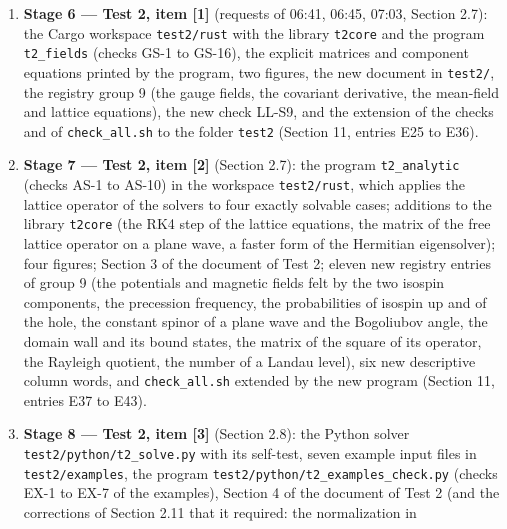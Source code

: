 \documentclass[
  10pt,
]{article}
\begin{document}
\begin{enumerate}
  \texttt{r13\_yukawa} with the checks Z-1 to Z-8, four new figures, the
  document in \texttt{explanations/}, new registry entries
  (\(\mathsf L_{\rm LL}(\mathbf g)\), \(\chi_{\rm LL}\),
  \(\theta_{\rm LL}\), \(\mathcal L^{\rm Y}_{\rm LL}\) and
  \(\mathcal L^{\rm c}_{\rm LL}\), \(m^\phi_{\rm LL}\),
  \(I^{\rm ren}_{\rm LL}\), \(\mathfrak{so}(4)\)), and the extension of
  the checks and of \texttt{check\_all.sh} to the new document (Section
  11, entries E18 to E24).
\item
  \textbf{Stage 6 --- Test 2, item {[}1{]}} (requests of 06:41, 06:45,
  07:03, Section 2.7): the Cargo workspace \texttt{test2/rust} with the
  library \texttt{t2core} and the program \texttt{t2\_fields} (checks
  GS-1 to GS-16), the explicit matrices and component equations printed
  by the program, two figures, the new document in \texttt{test2/}, the
  registry group 9 (the gauge fields, the covariant derivative, the
  mean-field and lattice equations), the new check LL-S9, and the
  extension of the checks and of \texttt{check\_all.sh} to the folder
  \texttt{test2} (Section 11, entries E25 to E36).
\item
  \textbf{Stage 7 --- Test 2, item {[}2{]}} (Section 2.7): the program
  \texttt{t2\_analytic} (checks AS-1 to AS-10) in the workspace
  \texttt{test2/rust}, which applies the lattice operator of the solvers
  to four exactly solvable cases; additions to the library
  \texttt{t2core} (the RK4 step of the lattice equations, the matrix of
  the free lattice operator on a plane wave, a faster form of the
  Hermitian eigensolver); four figures; Section 3 of the document of
  Test 2; eleven new registry entries of group 9 (the potentials and
  magnetic fields felt by the two isospin components, the precession
  frequency, the probabilities of isospin up and of the hole, the
  constant spinor of a plane wave and the Bogoliubov angle, the domain
  wall and its bound states, the matrix of the square of its operator,
  the Rayleigh quotient, the number of a Landau level), six new
  descriptive column words, and \texttt{check\_all.sh} extended by the
  new program (Section 11, entries E37 to E43).
\item
  \textbf{Stage 8 --- Test 2, item {[}3{]}} (Section 2.8): the Python
  solver \texttt{test2/python/t2\_solve.py} with its self-test, seven
  example input files in \texttt{test2/examples}, the program
  \texttt{test2/python/t2\_examples\_check.py} (checks EX-1 to EX-7 of
  the examples), Section 4 of the document of Test 2 (and the
  corrections of Section 2.11 that it required: the normalization in

\end{enumerate}
\end{document}
